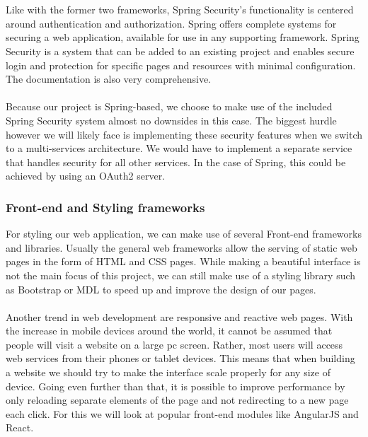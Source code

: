 \documentclass[12pt]{article}
\begin{document}
\begin{multicols}{2}
\\\\
Like with the former two frameworks, Spring Security’s functionality is centered around authentication and authorization. Spring offers complete systems for securing a web application, available for use in any supporting framework. Spring Security is a system that can be added to an existing project and enables secure login and protection for specific pages and resources with minimal configuration. The documentation is also very comprehensive.
\\\\
Because our project is Spring-based, we choose to make use of the included Spring Security system almost no downsides in this case. The biggest hurdle however we will likely face is implementing these security features when we switch to a multi-services architecture. We would  have to implement a separate service that handles security for all other services. In the case of Spring, this could be achieved by using an OAuth2 server. \cite{SpringCloudSecurity52:online}

\subsubsection{Front-end and Styling frameworks}
For styling our web application, we can make use of several Front-end frameworks and libraries. Usually the general web frameworks allow the serving of static web pages in the form of HTML and CSS pages. While making a beautiful interface is not the main focus of this project, we can still make use of a styling library such as Bootstrap or MDL to speed up and improve the design of our pages.
\\\\
Another trend in web development are responsive and reactive web pages. With the increase in mobile devices around the world, it cannot be assumed that people will visit a website on a large pc screen. Rather, most users will access web services from their phones or tablet devices. This means that when building a website we should try to make the interface scale properly for any size of device. Going even further than that, it is possible to improve performance by only reloading separate elements of the page and not redirecting to a new page each click. For this we will look at popular front-end modules like AngularJS and React. 

\end{multicols}
\end{document}
